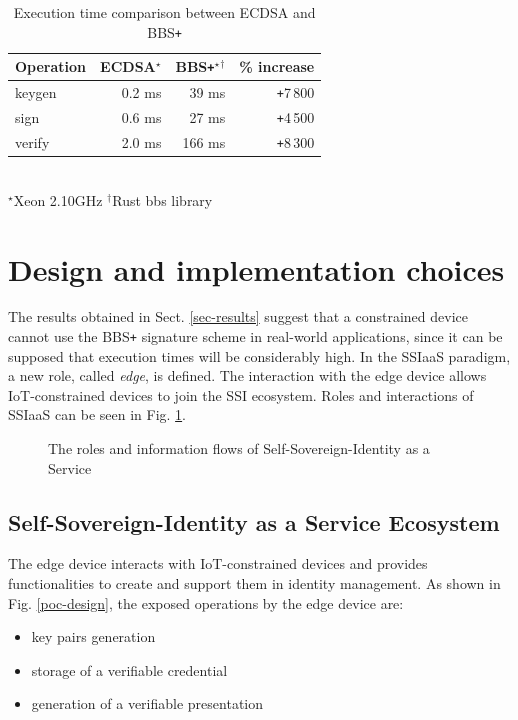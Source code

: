 \begin{table}[!h]
    \centering
    \begin{tabular}{| l || r | r | r|}
        \hline 
        \textbf{Operation} & \textbf{ECDSA}$^\star$ & \textbf{BBS\texttt{+}}$^\star$$^\dagger$ & \textbf{\% increase} \\ [0.5ex] 
        \hline  \hline 
        keygen   & 0.2   ms      & 39 ms   &\texttt{+}7\,800\\
        \hline
        sign     & 0.6   ms      & 27  ms   &\texttt{+}4\,500\\
        \hline
        verify   & 2.0  ms         & 166 ms   &\texttt{+}8\,300\\
        \hline
    \end{tabular}
    \\
    \footnotesize $^\star$Xeon 2.10GHz \enspace\enspace $^\dagger$Rust bbs library
    \caption{Execution time comparison between ECDSA and BBS\texttt{+}}
    \label{time-table2}
\end{table}

\section{Design and implementation choices}
\label{sec:Design}
The results obtained in Sect. \ref{sec-results} suggest that a constrained device cannot use the BBS\texttt{+} signature scheme in real-world applications, since it can be supposed that execution times will be considerably high. In the SSIaaS paradigm, a new role, called \textit{edge}, is defined. The interaction with the edge device allows IoT-constrained devices to join the SSI ecosystem. Roles and interactions of SSIaaS can be seen in Fig. \ref{SSIaaS-img}.

\begin{figure}[H]
    \centering
    
    \caption{The roles and information flows of Self-Sovereign-Identity as a Service}
    \label{SSIaaS-img}
\end{figure}

\subsection{Self-Sovereign-Identity as a Service Ecosystem}
\label{sec:SSIaaS-ecosystem}
The edge device interacts with IoT-constrained devices and provides functionalities to create and support them in identity management. As shown in Fig. \ref{poc-design}, the exposed operations by the edge device are:
\begin{itemize}
    \item key pairs generation
    \item storage of a verifiable credential
    \item generation of a verifiable presentation
\end{itemize}

